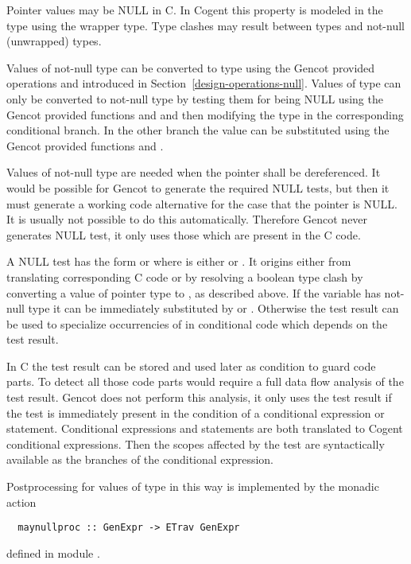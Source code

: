 Pointer values may be NULL in C. In Cogent this property is modeled in the type using the  wrapper type. Type clashes
may result between  types and not-null (unwrapped) types.

Values of not-null type can be converted to  type using the Gencot provided operations  and 
introduced in Section~\ref{design-operations-null}. Values of  type can only be converted to not-null type by testing them
for being NULL using the Gencot provided functions  and  and then modifying the type in the corresponding
conditional branch. In the other branch the value can be substituted using the Gencot provided functions  and .

Values of not-null type are needed when the pointer shall be dereferenced. It would be possible for Gencot to generate the required
NULL tests, but then it must generate a working code alternative for the case that the pointer is NULL. It is usually not possible to
do this automatically. Therefore Gencot never generates NULL test, it only uses those which are present in the C code.

A NULL test has the form  or  where  is either \code{==} or \code{/=}. It origins
either from translating corresponding C code or by resolving a boolean type clash by converting a value of pointer type to , as
described above. If the variable  has not-null type it can be immediately substituted by  or . Otherwise the
test result can be used to specialize occurrencies of  in conditional code which depends on the test result.

In C the test result can be stored and used later as condition to guard code parts. To detect all those code parts would require a full
data flow analysis of the test result. Gencot does not perform this analysis, it only uses the test result if the test is immediately
present in the condition of a conditional expression or statement. Conditional expressions and statements are both translated to Cogent
conditional expressions. Then the scopes affected by the test are syntactically available as the branches of the conditional expression.

Postprocessing for values of  type in this way is implemented by the monadic action
\begin{verbatim}
  maynullproc :: GenExpr -> ETrav GenExpr
\end{verbatim}
defined in module .

